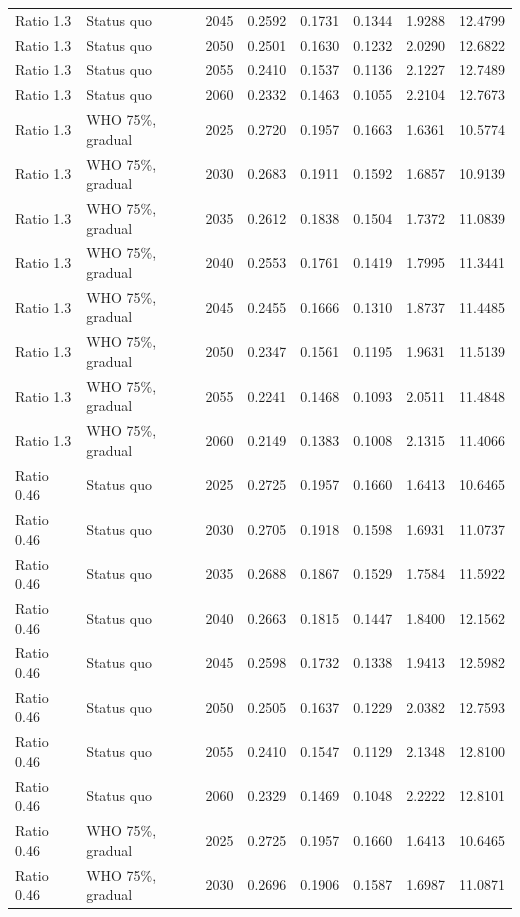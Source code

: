 \begin{longtable}{llrrrrrr}
Ratio 1.3 & Status quo & 2045 & 0.2592 & 0.1731 & 0.1344 & 1.9288 & 12.4799 \\
Ratio 1.3 & Status quo & 2050 & 0.2501 & 0.1630 & 0.1232 & 2.0290 & 12.6822 \\
Ratio 1.3 & Status quo & 2055 & 0.2410 & 0.1537 & 0.1136 & 2.1227 & 12.7489 \\
Ratio 1.3 & Status quo & 2060 & 0.2332 & 0.1463 & 0.1055 & 2.2104 & 12.7673 \\
Ratio 1.3 & WHO 75\%, gradual & 2025 & 0.2720 & 0.1957 & 0.1663 & 1.6361 & 10.5774 \\
Ratio 1.3 & WHO 75\%, gradual & 2030 & 0.2683 & 0.1911 & 0.1592 & 1.6857 & 10.9139 \\
Ratio 1.3 & WHO 75\%, gradual & 2035 & 0.2612 & 0.1838 & 0.1504 & 1.7372 & 11.0839 \\
Ratio 1.3 & WHO 75\%, gradual & 2040 & 0.2553 & 0.1761 & 0.1419 & 1.7995 & 11.3441 \\
Ratio 1.3 & WHO 75\%, gradual & 2045 & 0.2455 & 0.1666 & 0.1310 & 1.8737 & 11.4485 \\
Ratio 1.3 & WHO 75\%, gradual & 2050 & 0.2347 & 0.1561 & 0.1195 & 1.9631 & 11.5139 \\
Ratio 1.3 & WHO 75\%, gradual & 2055 & 0.2241 & 0.1468 & 0.1093 & 2.0511 & 11.4848 \\
Ratio 1.3 & WHO 75\%, gradual & 2060 & 0.2149 & 0.1383 & 0.1008 & 2.1315 & 11.4066 \\
Ratio 0.46 & Status quo & 2025 & 0.2725 & 0.1957 & 0.1660 & 1.6413 & 10.6465 \\
Ratio 0.46 & Status quo & 2030 & 0.2705 & 0.1918 & 0.1598 & 1.6931 & 11.0737 \\
Ratio 0.46 & Status quo & 2035 & 0.2688 & 0.1867 & 0.1529 & 1.7584 & 11.5922 \\
Ratio 0.46 & Status quo & 2040 & 0.2663 & 0.1815 & 0.1447 & 1.8400 & 12.1562 \\
Ratio 0.46 & Status quo & 2045 & 0.2598 & 0.1732 & 0.1338 & 1.9413 & 12.5982 \\
Ratio 0.46 & Status quo & 2050 & 0.2505 & 0.1637 & 0.1229 & 2.0382 & 12.7593 \\
Ratio 0.46 & Status quo & 2055 & 0.2410 & 0.1547 & 0.1129 & 2.1348 & 12.8100 \\
Ratio 0.46 & Status quo & 2060 & 0.2329 & 0.1469 & 0.1048 & 2.2222 & 12.8101 \\
Ratio 0.46 & WHO 75\%, gradual & 2025 & 0.2725 & 0.1957 & 0.1660 & 1.6413 & 10.6465 \\
Ratio 0.46 & WHO 75\%, gradual & 2030 & 0.2696 & 0.1906 & 0.1587 & 1.6987 & 11.0871 \\

\end{longtable}
